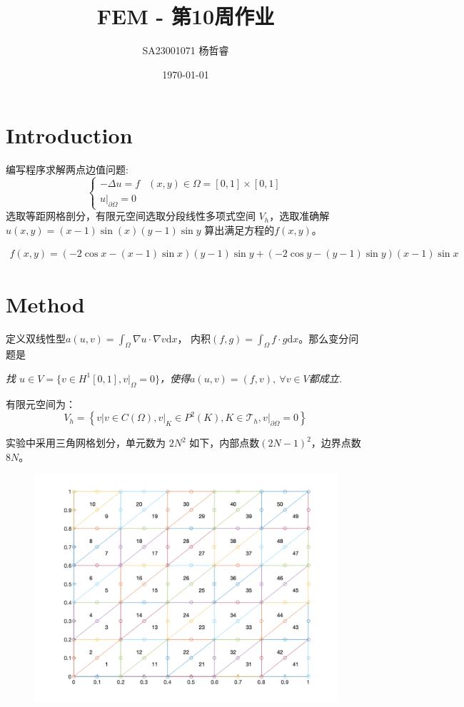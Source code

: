 \documentclass{ctexart}
\title{FEM - 第10周作业}
\author{SA23001071 杨哲睿}
\date{\today}
\begin{document}
\maketitle


\section{Introduction}
编写程序求解两点边值问题:
\begin{equation}
  \begin{cases}
    - \Delta u = f & (x, y) \in \Omega = [0, 1] \times [0, 1]\\
    u|_{\partial \Omega} = 0
  \end{cases}
\end{equation}
选取等距网格剖分，有限元空间选取分段线性多项式空间 $V_h$，选取准确解 $u(x,y) = (x-1) \sin (x) (y-1) \sin y$ 算出满足方程的$f(x, y)$。

\begin{eqnarray}
  f(x, y) = (-2\cos x- (x-1) \sin x) (y-1)\sin y + (-2\cos y-(y-1)\sin y)(x-1)\sin x
\end{eqnarray}

\section{Method}

定义双线性型$a(u, v) = \int_\Omega \nabla u \cdot \nabla v \mathrm dx$，
内积$(f, g) = \int_\Omega f \cdot g \mathrm dx$。那么变分问题是

\textit{找 $u\in V = \{ v\in H^1[0, 1], v|_\Omega = 0\}$，使得$a(u, v) = (f, v), ~ \forall v \in V$都成立.}


有限元空间为：
\begin{equation}
  V_h = \left\{v | v\in C(\Omega), v|_K \in P^2(K) , K \in \mathcal{T}_h, v| _{\partial \Omega} =0\right\}
\end{equation}

实验中采用三角网格划分，单元数为 $2N^2$ 如下，内部点数$(2N-1)^2$，边界点数$8N$。

\begin{figure}[H]
  \centering
  \includegraphics[width=0.8\linewidth]{mesh.png}
\end{figure}
\end{document}
